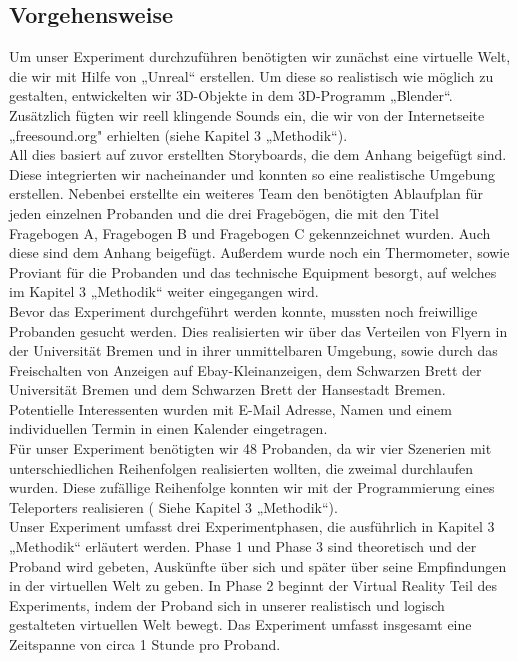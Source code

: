 \documentclass{Paper}
\begin{document}
\subsection{Vorgehensweise}
Um unser Experiment durchzuführen benötigten wir zunächst eine virtuelle Welt, die wir mit Hilfe von „Unreal“ erstellen. Um diese so realistisch wie möglich zu gestalten, entwickelten wir 3D-Objekte in dem 3D-Programm „Blender“. Zusätzlich fügten wir reell klingende Sounds ein, die wir von der Internetseite „freesound.org" erhielten (siehe Kapitel 3 „Methodik“). \\
All dies basiert auf zuvor erstellten Storyboards, die dem Anhang beigefügt sind. \\
Diese integrierten wir nacheinander und konnten so eine realistische Umgebung erstellen. Nebenbei erstellte ein weiteres Team den benötigten Ablaufplan für jeden einzelnen Probanden und die drei Fragebögen, die mit den Titel Fragebogen A, Fragebogen B und Fragebogen C gekennzeichnet wurden. Auch diese sind dem Anhang beigefügt. Außerdem wurde noch ein Thermometer, sowie Proviant für die Probanden und das technische Equipment besorgt, auf welches im Kapitel 3 „Methodik“ weiter eingegangen wird. \\
Bevor das Experiment durchgeführt werden konnte, mussten noch freiwillige Probanden gesucht werden. Dies realisierten wir über das Verteilen von Flyern in der Universität Bremen und in ihrer unmittelbaren Umgebung, sowie durch das Freischalten von Anzeigen auf Ebay-Kleinanzeigen, dem Schwarzen Brett der Universität Bremen und dem Schwarzen Brett der Hansestadt Bremen. Potentielle Interessenten wurden mit E-Mail Adresse, Namen und einem individuellen Termin in einen Kalender eingetragen.\\
Für unser Experiment benötigten wir 48 Probanden, da wir vier Szenerien mit unterschiedlichen Reihenfolgen realisierten wollten, die zweimal durchlaufen wurden. Diese zufällige Reihenfolge konnten wir mit der Programmierung eines Teleporters realisieren ( Siehe Kapitel 3 „Methodik“). \\
Unser Experiment umfasst drei Experimentphasen, die ausführlich in Kapitel 3 „Methodik“ erläutert werden. Phase 1 und Phase 3 sind theoretisch und der Proband wird gebeten, Auskünfte über sich und später über seine Empfindungen in der virtuellen Welt zu geben. In Phase 2 beginnt der Virtual Reality Teil des Experiments, indem der Proband sich in unserer realistisch und logisch gestalteten virtuellen Welt bewegt. Das Experiment umfasst insgesamt eine Zeitspanne von circa 1 Stunde pro Proband. 
\end{document}
